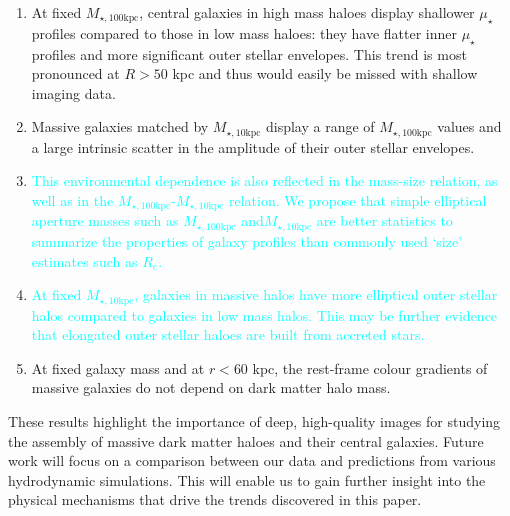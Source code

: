 \documentclass[a4paper,fleqn,usenatbib]{mnras}
\def\minn{{$M_{\star,10\mathrm{kpc}}$}}
\def\mtot{{$M_{\star,100\mathrm{kpc}}$}}
\def\mden{{$\mu_{\star}$}}
\newcommand{\song}[1]{\textcolor{cyan}{#1}}
\begin{document}
    \begin{enumerate}
    
    \item At fixed \mtot{}, central galaxies in high mass haloes display shallower 
        \mden{} profiles compared to those in low mass haloes: they have flatter inner 
        \mden{} profiles and more significant outer stellar envelopes.  
        This trend is most pronounced at $R>50$ kpc and thus would easily be missed 
        with shallow imaging data.                 
                                
    \item Massive galaxies matched by \minn{} display a range of \mtot{} values and a 
        large intrinsic scatter in the amplitude of their outer stellar envelopes. 
        
    \item \song{
        This environmental dependence is also reflected in the mass-size relation, 
        as well as in the \mtot{}-\minn{} relation. 
        We propose that simple elliptical aperture masses such as \mtot{} and\minn{} 
        are better statistics to summarize the properties of galaxy profiles than 
        commonly used `size' estimates such as $R_e$.
        }
      
    \item \song{
        At fixed \minn{}, galaxies in massive halos have more elliptical outer 
        stellar halos compared to galaxies in low mass halos. 
        This may be further evidence that elongated outer stellar haloes are built 
        from accreted stars.
        }
                     
    \item At fixed galaxy mass and at $r<60$ kpc, the rest-frame colour gradients 
        of massive galaxies do not depend on dark matter halo mass. 
             
    \end{enumerate}
    
    These results highlight the importance of deep, high-quality images for studying 
    the assembly of massive dark matter haloes and their central galaxies. 
    Future work will focus on a comparison between our data and predictions from 
    various hydrodynamic simulations. 
    This will enable us to gain further insight into the physical mechanisms that 
    drive the trends discovered in this paper.
\end{document}
